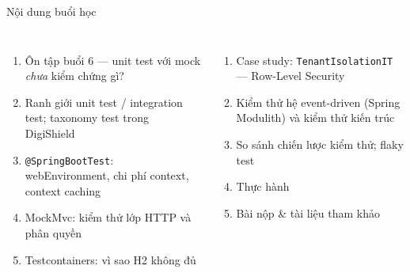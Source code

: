 \documentclass[aspectratio=169,12pt]{beamer}
\begin{document}
\begin{frame}{Nội dung buổi học}
  \begin{columns}[t]
    \begin{enumerate}\small
      \item Ôn tập buổi 6 --- unit test với mock \emph{chưa} kiểm chứng gì?
      \item Ranh giới unit test / integration test; taxonomy test trong DigiShield
      \item \texttt{@SpringBootTest}: webEnvironment, chi phí context, context caching
      \item MockMvc: kiểm thử lớp HTTP và phân quyền
      \item Testcontainers: vì sao H2 không đủ
    \end{enumerate}
    \begin{enumerate}\small
      \setcounter{enumi}{5}
      \item Case study: \texttt{TenantIsolationIT} --- Row-Level Security
      \item Kiểm thử hệ event-driven (Spring Modulith) và kiểm thử kiến trúc
      \item So sánh chiến lược kiểm thử; flaky test
      \item Thực hành
      \item Bài nộp \& tài liệu tham khảo
    \end{enumerate}
  \end{columns}
\end{frame}
\end{document}
